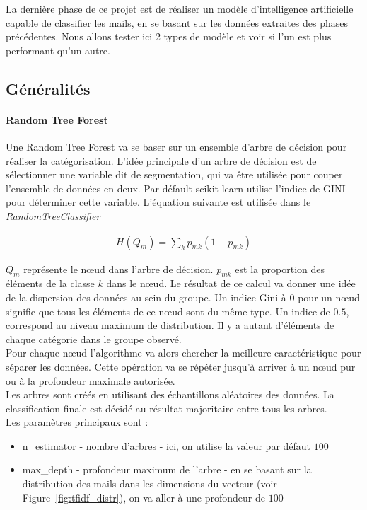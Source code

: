 La dernière phase de ce projet est de réaliser un modèle d'intelligence artificielle capable de classifier les mails, en se basant sur les données extraites des phases précédentes.
Nous allons tester ici 2 types de modèle et voir si l'un est plus performant qu'un autre.

\subsection*{Généralités}
    \paragraph{Random Tree Forest}
        Une Random Tree Forest va se baser sur un ensemble d'arbre de décision pour réaliser la catégorisation.
        L'idée principale d'un arbre de décision est de sélectionner une variable dit de segmentation, qui va être utilisée pour couper l'ensemble de données en deux.
        Par défault scikit learn utilise l'indice de GINI pour déterminer cette variable.
        L'équation suivante est utilisée dans le  \emph{RandomTreeClassifier}

        \begin{eqnarray*}
            H(Q_m) = \sum_k p_{mk} (1 - p_{mk})
        \end{eqnarray*}

        $Q_m$ représente le nœud dans l'arbre de décision.
        $p_{mk}$ est la proportion des éléments de la classe $k$ dans le nœud.
        Le résultat de ce calcul va donner une idée de la dispersion des données au sein du groupe.
        Un indice Gini à 0 pour un nœud signifie que tous les éléments de ce nœud sont du même type.
        Un indice de $0.5$, correspond au niveau maximum de distribution.
        Il y a autant d'éléments de chaque catégorie dans le groupe observé.\\

        Pour chaque nœud l'algorithme va alors chercher la meilleure caractéristique pour séparer les données.
        Cette opération va se répéter jusqu'à arriver à un nœud pur ou à la profondeur maximale autorisée.\\

        Les arbres sont créés en utilisant des échantillons aléatoires des données.
        La classification finale est décidé au résultat majoritaire entre tous les arbres.\\

        Les paramètres principaux sont :
        \begin{itemize}
            \item n\_estimator - nombre d'arbres - ici, on utilise la valeur par défaut $100$
            \item max\_depth - profondeur maximum de l'arbre - en se basant sur la distribution des mails dans les dimensions du vecteur (voir Figure~\ref{fig:tfidf_distr}), on va aller à une profondeur de $100$
        \end{itemize}

